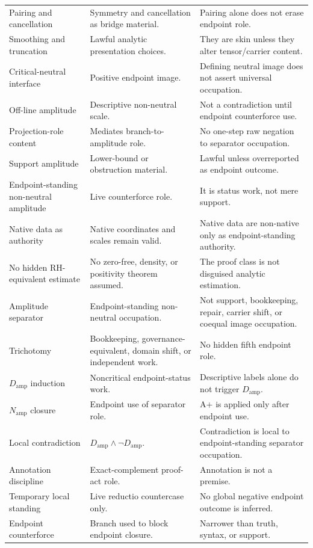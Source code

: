 \documentclass[11pt]{article}
\newcommand{\Damp}{D_{\mathrm{amp}}}
\newcommand{\Namp}{N_{\mathrm{amp}}}
\begin{document}
\begin{longtable}{L{0.23\textwidth}L{0.34\textwidth}L{0.33\textwidth}}
Pairing and cancellation & Symmetry and cancellation as bridge material. & Pairing alone does not erase endpoint role.\\
Smoothing and truncation & Lawful analytic presentation choices. & They are skin unless they alter tensor/carrier content.\\
Critical-neutral interface & Positive endpoint image. & Defining neutral image does not assert universal occupation.\\
Off-line amplitude & Descriptive non-neutral scale. & Not a contradiction until endpoint counterforce use.\\
Projection-role content & Mediates branch-to-amplitude role. & No one-step raw negation to separator occupation.\\
Support amplitude & Lower-bound or obstruction material. & Lawful unless overreported as endpoint outcome.\\
Endpoint-standing non-neutral amplitude & Live counterforce role. & It is status work, not mere support.\\
Native data as authority & Native coordinates and scales remain valid. & Native data are non-native only as endpoint-standing authority.\\
No hidden RH-equivalent estimate & No zero-free, density, or positivity theorem assumed. & The proof class is not disguised analytic estimation.\\
Amplitude separator & Endpoint-standing non-neutral occupation. & Not support, bookkeeping, repair, carrier shift, or coequal image occupation.\\
Trichotomy & Bookkeeping, governance-equivalent, domain shift, or independent work. & No hidden fifth endpoint role.\\
\(\Damp\) induction & Noncritical endpoint-status work. & Descriptive labels alone do not trigger \(\Damp\).\\
\(\Namp\) closure & Endpoint use of separator role. & A+ is applied only after endpoint use.\\
Local contradiction & \(\Damp\wedge\neg\Damp\). & Contradiction is local to endpoint-standing separator occupation.\\
Annotation discipline & Exact-complement proof-act role. & Annotation is not a premise.\\
Temporary local standing & Live reductio countercase only. & No global negative endpoint outcome is inferred.\\
Endpoint counterforce & Branch used to block endpoint closure. & Narrower than truth, syntax, or support.\\

\end{longtable}
\end{document}
